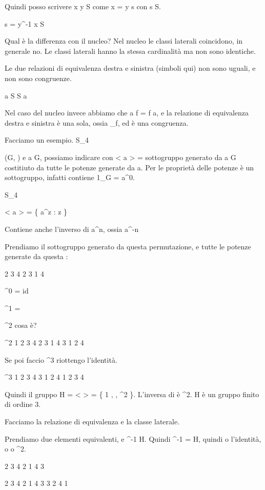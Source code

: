 Quindi posso scrivere x \in y \cdot S come x = y \cdot s con s \in S.

s = y^{-1} \cdot x \in S

Qual \`e la differenza con il nucleo? Nel nucleo le classi laterali coincidono, in generale no. Le classi laterali hanno la stessa cardinalit\`a ma non sono identiche.

Le due relazioni di equivalenza destra e sinistra (simboli qui) non sono uguali, e non sono congruenze.

a \cdot S \neq S \cdot a

Nel caso del nucleo invece abbiamo che a \cdot \ker f = \ker f \cdot a, e la relazione di equivalenza destra e sinistra \`e una sola, ossia \varepsilon_f, ed \`e una congruenza.

Facciamo un esempio. S_4

(G, \cdot) e a \in G, possiamo indicare con < a > = sottogruppo generato da a \in G costitiuto da tutte le potenze generate da a. Per le propriet\`a delle potenze \`e un sottogruppo, infatti contiene 1_G = a^{0}.

S_4

< a > = \{ a^{z} : z \in {} \}

Contiene anche l'inverso di a^{n}, ossia a^{-n}

Prendiamo il sottogruppo generato da questa permutazione, e tutte le potenze generate da questa \sigma:

 2 3 4
2 3 1 4

\sigma^{0} = id

\sigma^{1} = \sigma

\sigma^{2} cosa \`e?

\sigma^{2}
1 2 3 4
2 3 1 4
3 1 2 4

Se poi faccio \sigma^{3} riottengo l'identit\`a.

\sigma^{3}
1 2 3 4
3 1 2 4
1 2 3 4

Quindi il gruppo H = < \sigma > = \{ 1 , \sigma, \sigma^{2} \}. L'inversa di \sigma \`e \sigma^{2}. H \`e un gruppo finito di ordine 3.

Facciamo la relazione di equivalenza e la classe laterale.

Prendiamo due elementi equivalenti, \mu  e \tau \Leftrightarrow \sigma \tau^{-1} \in H. Quindi \mu \tau^{-1} = \rho \in H, quindi o l'identit\`a, o \sigma o \sigma^{2}.

 2 3 4
2 1 4 3

\tau {} 2 3 4
2 1 4 3
3 2 4 1

